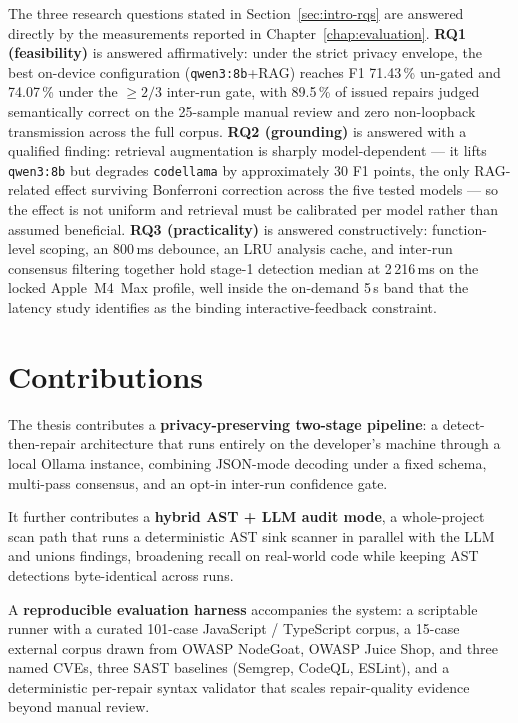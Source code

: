 The three research questions stated in Section~\ref{sec:intro-rqs} are answered directly by the measurements reported in Chapter~\ref{chap:evaluation}. \textbf{RQ1 (feasibility)} is answered affirmatively: under the strict privacy envelope, the best on-device configuration (\texttt{qwen3:8b}+RAG) reaches F1 71.43\,\% un-gated and 74.07\,\% under the $\geq 2/3$ inter-run gate, with 89.5\,\% of issued repairs judged semantically correct on the 25-sample manual review and zero non-loopback transmission across the full corpus. \textbf{RQ2 (grounding)} is answered with a qualified finding: retrieval augmentation is sharply model-dependent --- it lifts \texttt{qwen3:8b} but degrades \texttt{codellama} by approximately 30 F1 points, the only RAG-related effect surviving Bonferroni correction across the five tested models --- so the effect is not uniform and retrieval must be calibrated per model rather than assumed beneficial. \textbf{RQ3 (practicality)} is answered constructively: function-level scoping, an 800\,ms debounce, an LRU analysis cache, and inter-run consensus filtering together hold stage-1 detection median at 2\,216\,ms on the locked Apple~M4~Max profile, well inside the on-demand 5\,s band that the latency study identifies as the binding interactive-feedback constraint.


\section{Contributions}

The thesis contributes a \textbf{privacy-preserving two-stage pipeline}: a detect-then-repair architecture that runs entirely on the developer's machine through a local Ollama instance, combining JSON-mode decoding under a fixed schema, multi-pass consensus, and an opt-in inter-run confidence gate.

It further contributes a \textbf{hybrid AST + LLM audit mode}, a whole-project scan path that runs a deterministic AST sink scanner in parallel with the LLM and unions findings, broadening recall on real-world code while keeping AST detections byte-identical across runs.

A \textbf{reproducible evaluation harness} accompanies the system: a scriptable runner with a curated 101-case JavaScript / TypeScript corpus, a 15-case external corpus drawn from OWASP NodeGoat, OWASP Juice Shop, and three named CVEs, three SAST baselines (Semgrep, CodeQL, ESLint), and a deterministic per-repair syntax validator that scales repair-quality evidence beyond manual review.

